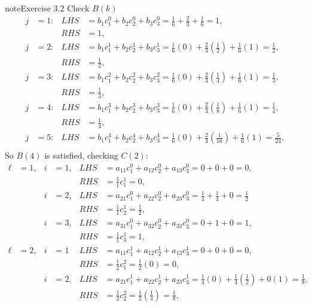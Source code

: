 \documentclass[letterpaper,10pt,english]{jupyterBook}
\begin{document}
\begin{sphinxadmonition}{note}{Exercise 3.2}
\sphinxAtStartPar
Check \(B(k)\)
\begin{align*}
    j &= 1: & LHS &= b_1 c_1^0 + b_2 c_2^0 + b_3 c_3^0 = \tfrac{1}{6} + \tfrac{2}{3} + \tfrac{1}{6} = 1, \\
    && RHS &= 1, \\
    j &= 2: & LHS &= b_1 c_1^1 + b_2 c_2^1 + b_3 c_3^1 = \tfrac{1}{6}(0) + \tfrac{2}{3}(\tfrac{1}{2}) + \tfrac{1}{6}(1) = \tfrac{1}{2}, \\
    && RHS &= \tfrac{1}{2}, \\ 
    j &= 3: & LHS &= b_1 c_1^2 + b_2 c_2^2 + b_3 c_3^2 = \tfrac{1}{6}(0) + \tfrac{2}{3}(\tfrac{1}{4}) + \tfrac{1}{6}(1) = \tfrac{1}{3}, \\
    && RHS &= \tfrac{1}{3}, \\
    j &= 4: & LHS &= b_1 c_1^3 + b_2 c_2^3 + b_3 c_3^3 = \tfrac{1}{6}(0) + \tfrac{2}{3}(\tfrac{1}{8}) + \tfrac{1}{6}(1) = \tfrac{1}{4}, \\
    && RHS &= \tfrac{1}{4}, \\
    j &= 5: & LHS &= b_1 c_1^4 + b_2 c_2^4 + b_3 c_3^4 = \tfrac{1}{6}(0) + \tfrac{2}{3}(\tfrac{1}{16}) + \tfrac{1}{6}(1) = \tfrac{5}{24}, \\
\end{align*}
\sphinxAtStartPar
So \(B(4)\) is satisfied, checking \(C(2)\):
\begin{align*}
    \ell &= 1, & i &= 1, & LHS &= a_{11} c_1^0 + a_{12} c_2^0 + a_{13} c_3^0 = 0 + 0 + 0 = 0, \\
    &&&& RHS &= \tfrac{1}{1} c_1^1 = 0, \\
    && i &= 2, & LHS &= a_{21} c_1^0 + a_{22} c_2^0 + a_{23} c_3^0 = \tfrac{1}{4} + \tfrac{1}{4} + 0 = \tfrac{1}{2} \\
    &&&& RHS &= \tfrac{1}{1} c_2^1 = \tfrac{1}{2}, \\
    && i &= 3, & LHS &= a_{31} c_1^0 + a_{32} c_2^0 + a_{33} c_3^0 = 0 + 1 + 0 = 1, \\
    &&&& RHS &= \tfrac{1}{1} c_3^1 = 1, \\
    \ell &= 2, & i &= 1 & LHS &= a_{11} c_1^1 + a_{12} c_2^1 + a_{13} c_3^1 = 0 + 0 + 0 = 0, \\
    &&&& RHS &= \tfrac{1}{2} c_1^2 = \tfrac{1}{2}(0) = 0, \\
    && i &= 2, & LHS &= a_{21} c_1^1 + a_{22} c_2^1 + a_{23} c_3^1 = \tfrac{1}{4}(0) + \tfrac{1}{4}(\tfrac{1}{2}) + 0(1) = \tfrac{1}{8}, \\
    &&&& RHS &= \tfrac{1}{2} c_2^2 = \tfrac{1}{2} (\tfrac{1}{4}) = \tfrac{1}{8}, \\

\end{align*}
\end{sphinxadmonition}
\end{document}
